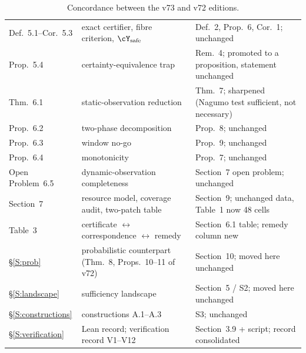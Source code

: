\begin{table}[htbp]
\begin{tabularx}{\textwidth}{@{}l>{\raggedright\arraybackslash}X>{\raggedright\arraybackslash}X@{}}
Def.~5.1--Cor.~5.3 & exact certifier, fibre criterion, $\cY_{\mathrm{safe}}$ & Def.~2, Prop.~6, Cor.~1; unchanged\\
Prop.~5.4 & certainty-equivalence trap & Rem.~4; promoted to a proposition, statement unchanged\\
Thm.~6.1 & static-observation reduction & Thm.~7; sharpened (Nagumo test sufficient, not necessary)\\
Prop.~6.2 & two-phase decomposition & Prop.~8; unchanged\\
Prop.~6.3 & window no-go & Prop.~9; unchanged\\
Prop.~6.4 & monotonicity & Prop.~7; unchanged\\
Open Problem~6.5 & dynamic-observation completeness & Section~7 open problem; unchanged\\
Section~7 & resource model, coverage audit, two-patch table & Section~9; unchanged data, Table~1 now 48 cells\\
Table~3 & certificate $\leftrightarrow$ correspondence $\leftrightarrow$ remedy & Section~6.1 table; remedy column new\\
\S\ref{S:prob} & probabilistic counterpart (Thm.~8, Props.~10--11 of v72) & Section~10; moved here unchanged\\
\S\ref{S:landscape} & sufficiency landscape & Section~5 / S2; moved here unchanged\\
\S\ref{S:constructions} & constructions A.1--A.3 & S3; unchanged\\
\S\ref{S:verification} & Lean record; verification record V1--V12 & Section~3.9 + script; record consolidated\\
\bottomrule
\end{tabularx}
\caption{Concordance between the v73 and v72 editions.}
\label{tab:concordance}
\end{table}
